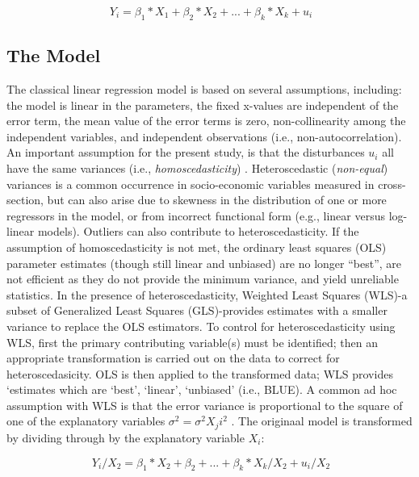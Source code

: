 \documentclass[sigconf]{acmart}
\begin{document}
\begin{equation}
  \ Y_i = \beta_1*X_1 + \beta_2*X_2 +... + \beta_k*X_k + u_i
\end{equation}

\subsection{The Model}

The classical linear regression model is based on several assumptions, 
including: the model is linear in the parameters, the fixed x-values are 
independent of the error term, the mean value of the error terms is zero, 
non-collinearity among the independent variables, and independent 
observations (i.e., non-autocorrelation). An important assumption for the 
present study, is that the disturbances $u_i$ all have the same variances 
(i.e., \emph{homoscedasticity}) . Heteroscedastic 
(\emph{non-equal}) variances is a common occurrence in socio-economic 
variables measured in cross-section, but can also arise due to skewness in 
the distribution of one or more regressors in the model, or from incorrect 
functional form (e.g., linear versus log-linear models). Outliers can also 
contribute to heteroscedasticity. If the assumption of homoscedasticity is 
not met, the ordinary least squares (OLS) parameter estimates (though still 
linear and unbiased) are no longer ``best'', are not efficient as they do 
not provide the minimum variance, and yield unreliable statistics. In the 
presence of heteroscedasticity, Weighted Least Squares (WLS)-a subset of 
Generalized Least Squares (GLS)-provides estimates with a smaller variance to 
replace the OLS estimators.  To control for heteroscedasticity using WLS, first 
the primary contributing variable(s) must be identified; then an appropriate 
transformation is carried out on the data to correct for heteroscedasicity. 
OLS is then applied to the transformed data; WLS provides `estimates which
are `best', `linear', `unbiased' (i.e., BLUE). A common ad hoc assumption 
with WLS is that the error variance is proportional to the square of one of 
the explanatory variables $\sigma^2=\sigma^2 X_ji^2$ . 
The originaal model is transformed by dividing through by the explanatory 
variable $X_i$:

\begin{equation}
  \ Y_i/X_2 = \beta_1*X_2 + \beta_2 +... + \beta_k*X_k/X_2 + u_i/X_2
\end{equation}

\end{document}
